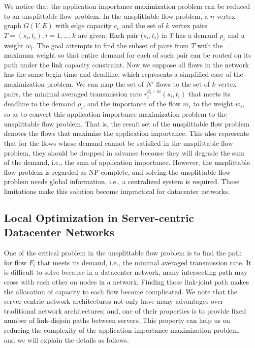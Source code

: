 \documentclass[conference]{IEEEtran}
\begin{document}
We notice that the application importance maximization problem can be reduced to an unsplittable flow problem. In the unsplittable flow problem, a $n$-vertex graph $G(V,E)$ with edge capacity $c_{e}$ and the set of $k$ vertex pairs $T={(s_{i},t_{i}),i=1,...,k}$ are given. Each pair ($s_{i},t_{i}$) in $T$ has a demand $\rho_{i}$ and a weight $w_{i}$. The goal attempts to find the subset of pairs from $T$ with the maximum weight so that entire demand for each of such pair can be routed on its path under the link capacity constraint. Now we suppose all flows in the network has the same begin time and deadline, which represents a simplified case of the maximization problem. We can map the set of $N'$ flows to the set of $k$ vertex pairs, the minimal averaged transmission rate $r_{i}^{d_{i}-b{i}}(s_{i},t_{i})$ that meets its deadline to the demand $\rho_{i}$, and the importance of the flow $m_{i}$ to the weight $w_{i}$, so as to convert this application importance maximization problem to the unsplittable flow problem. That is, the result set of the unsplittable flow problem denotes the flows that maximize the application importance. This also represents that for the flows whose demand cannot be satisfied in the unsplittable flow problem, they should be dropped in advance because they will degrade the sum of the demand, i.e., the sum of application importance. However, the unsplittable flow problem is regarded as NP-complete\cite{approximationunsplittable, reducibility}, and solving the unsplittable flow problem needs global information, i.e., a centralized system is required. Those limitations make this solution become impractical for datacenter networks.

\subsection{Local Optimization in Server-centric Datacenter Networks}

One of the critical problem in the unsplittable flow problem is to find the path for flow $F_{i}$ that meets its demand, i.e., the minimal averaged transmission rate. It is difficult to solve because in a datacenter network, many intersecting path may cross with each other on nodes in a network. Finding those link-joint path makes the allocation of capacity to each flow become complicated. We note that the server-centric network architectures not only have many advantages over traditional network architectures; and, one of their properties is to provide fixed number of link-disjoin paths between servers. This property can help us on reducing the complexity of the application importance maximization problem, and we will explain the details as follows.
\end{document}
